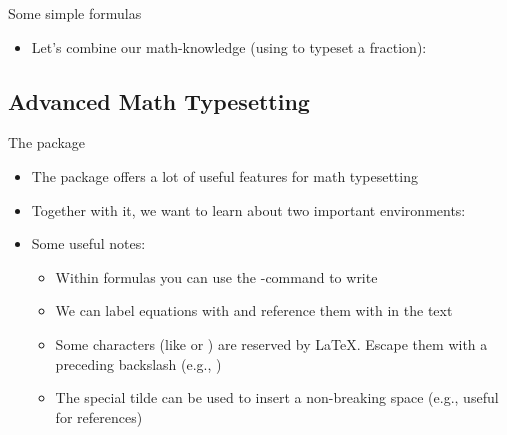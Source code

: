 \begin{frame}{Some simple formulas}
\soldisablenumhl{}\begin{itemize}
   \item Let's combine our math-knowledge (using \blatex{\\frac} to typeset a fraction):
\end{itemize}
\end{frame}

\subsection{Advanced Math Typesetting}
\begin{frame}{The  package}
   \begin{itemize}
      \itemsep8pt
      \item The  package offers a lot of useful features for math typesetting
      \item Together with it, we want to learn about two important environments:
      \item Some useful notes: \begin{itemize}
         \item Within formulas you can use the \blatex{\\text}-command to write 
         \item We can label equations with  and reference them with  in the text
         \item Some characters (like \blatex{\&} or \blatex{\#}) are reserved by \LaTeX. Escape them with a preceding backslash (e.g., \blatex{\\\&})
         \item The special tilde \blatex{\~} can be used to insert a non-breaking space (e.g., useful for references)
      \end{itemize}
   \end{itemize}
\end{frame}

